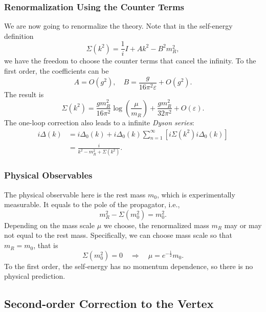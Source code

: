 \documentclass[aps,prb,superscriptaddress,nofootinbib]{revtex4}
\begin{document}
\subsubsection{Renormalization Using the Counter Terms}
We are now going to renormalize the theory.
Note that in the self-energy definition
\begin{equation}
	\Sigma(k^2) = \frac{1}{i} I + A k^2-B^2 m_R^2,
\end{equation}
we have the freedom to choose the counter terms that cancel the infinity.
To the first order, the coefficients can be
\begin{equation}
	A = O(g^2), \quad
	B = \frac{g}{16\pi^2 \varepsilon} + O(g^2).
\end{equation}
The result is
\begin{equation}
	\Sigma(k^2) = \frac{g m_R^2}{16\pi^2} \log \left(\frac{\mu}{m_R}\right)
	+\frac{g m_R^2}{32\pi^2}+O(\varepsilon).
\end{equation}
The one-loop correction also leads to a infinite \textit{Dyson series}:
\begin{equation}
\begin{aligned}
	i\Delta(k) &= i\Delta_0(k) + i\Delta_0(k)\sum_{n=1}^\infty \left[i\Sigma(k^2)i\Delta_0(k)\right] \\
	&= \frac{i}{k^2 -m_R^2 + \Sigma(k^2)}.
\end{aligned}
\end{equation}



\subsubsection{Physical Observables}
The physical observable here is the rest mass $m_0$, which is experimentally measurable.
It equals to the pole of the propagator, i.e.,
\begin{equation}
	m_R^2 - \Sigma(m_0^2) = m_0^2.
\end{equation}
Depending on the mass scale $\mu$ we choose, the renormalized mass $m_R$ may or may not equal to the rest mass.
Specifically, we can choose mass scale so that $m_R = m_0$, that is
\begin{equation}
	\Sigma(m_0^2) = 0 \quad \Longrightarrow \quad
	\mu = e^{-\frac{1}{2}} m_0.
\end{equation}
To the first order, the self-energy has no momentum dependence, so there is no physical prediction.




\subsection{Second-order Correction to the Vertex}
\end{document}
